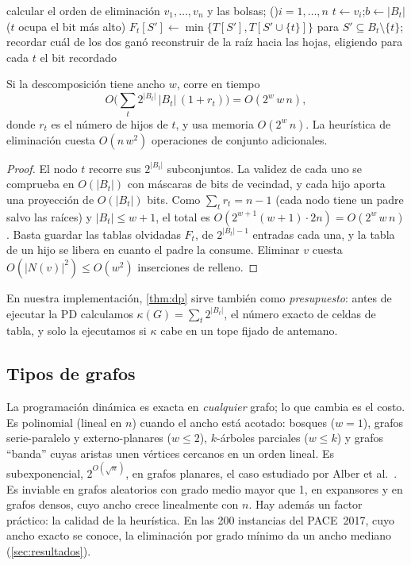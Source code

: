 \begin{algorithm}[!htbp]
\caption{$(G, W)$: programación dinámica sobre la descomposición por grado mínimo}\label{alg:dp}
calcular el orden de eliminación $v_1,\dots,v_n$ y las bolsas; 
\For(){$i=1,\dots,n$}{
  $t\gets v_i$;\quad $b\gets|B_t|$ ($t$ ocupa el bit más alto)\;
  $F_t[S']\gets\min\{T[S'],T[S'\cup\{t\}]\}$ para $S'\subseteq B_t\setminus\{t\}$; recordar cuál de los dos ganó\;
}
reconstruir de la raíz hacia las hojas, eligiendo para cada $t$ el bit recordado\;
\end{algorithm}

\begin{theorem}[Complejidad]\label{thm:dp}
Si la descomposición tiene ancho $w$,  corre en tiempo
\[O\Big(\sum_t 2^{|B_t|}\,|B_t|\,(1+r_t)\Big)=O(2^{w}\,w\,n),\]
donde $r_t$ es el número de hijos de $t$, y usa memoria $O(2^{w}\,n)$. La heurística de eliminación cuesta $O(n\,w^2)$ operaciones de conjunto adicionales.
\end{theorem}
\begin{proof}
El nodo $t$ recorre sus $2^{|B_t|}$ subconjuntos. La validez de cada uno se comprueba en $O(|B_t|)$ con máscaras de bits de vecindad, y cada hijo aporta una proyección de $O(|B_t|)$ bits. Como $\sum_t r_t=n-1$ (cada nodo tiene un padre salvo las raíces) y $|B_t|\le w+1$, el total es $O(2^{w+1}(w+1)\cdot 2n)=O(2^w\,w\,n)$. Basta guardar las tablas olvidadas $F_t$, de $2^{|B_t|-1}$ entradas cada una, y la tabla de un hijo se libera en cuanto el padre la consume. Eliminar $v$ cuesta $O(|N(v)|^2)\le O(w^2)$ inserciones de relleno.
\end{proof}
En nuestra implementación, \cref{thm:dp} sirve también como \emph{presupuesto}: antes de ejecutar la PD calculamos $\kappa(G)=\sum_t 2^{|B_t|}$, el número exacto de celdas de tabla, y solo la ejecutamos si $\kappa$ cabe en un tope fijado de antemano.

\subsection{Tipos de grafos}
La programación dinámica es exacta en \emph{cualquier} grafo; lo que cambia es el costo. Es polinomial (lineal en $n$) cuando el ancho está acotado: bosques ($w=1$), grafos serie-paralelo y externo-planares ($w\le 2$), $k$-árboles parciales ($w\le k$) y grafos ``banda'' cuyas aristas unen vértices cercanos en un orden lineal. Es subexponencial, $2^{O(\sqrt n)}$, en grafos planares, el caso estudiado por Alber et al.~\citep{alber2005}. Es inviable en grafos aleatorios con grado medio mayor que 1, en expansores y en grafos densos, cuyo ancho crece linealmente con $n$. Hay además un factor práctico: la calidad de la heurística. En las 200 instancias del PACE~2017, cuyo ancho exacto se conoce, la eliminación por grado mínimo da un ancho mediano  (\cref{sec:resultados}).
